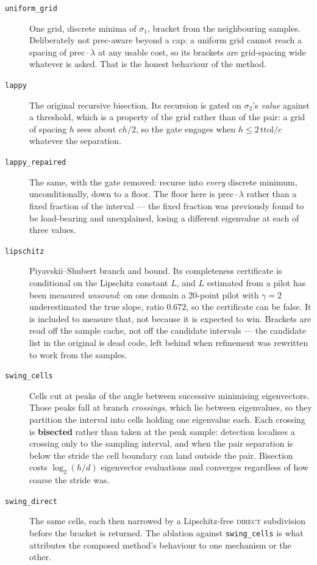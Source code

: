 \documentclass[11pt,a4paper]{article}
\newcommand{\pr}{\ensuremath{\mathrm{prec}}}
\newcommand{\lam}{\ensuremath{\lambda}}
\newcommand{\sig}{\ensuremath{\sigma}}
\begin{document}
\begin{description}
\item[\texttt{uniform\_grid}] One grid, discrete minima of $\sig_1$, bracket from the
neighbouring samples. Deliberately not $\pr$-aware beyond a cap: a uniform grid cannot reach a
spacing of $\pr\!\cdot\!\lam$ at any usable cost, so its brackets are grid-spacing wide
whatever is asked. That is the honest behaviour of the method.

\item[\texttt{lappy}] The original recursive bisection. Its recursion is gated on $\sig_2$'s
\emph{value} against a threshold, which is a property of the grid rather than of the pair: a
grid of spacing $h$ sees about $c h/2$, so the gate engages when $h \le 2\,\mathrm{ttol}/c$
whatever the separation.

\item[\texttt{lappy\_repaired}] The same, with the gate removed: recurse into \emph{every}
discrete minimum, unconditionally, down to a floor. The floor here is $\pr\!\cdot\!\lam$
rather than a fixed fraction of the interval --- the fixed fraction was previously found to be
load-bearing and unexplained, losing a different eigenvalue at each of three values.

\item[\texttt{lipschitz}] Piyavskii--Shubert branch and bound. Its completeness certificate is
conditional on the Lipschitz constant $L$, and $L$ estimated from a pilot has been measured
\emph{unsound}: on one domain a 20-point pilot with $\gamma = 2$ underestimated the true slope,
ratio $0.672$, so the certificate can be false. It is included to measure that, not because it
is expected to win. Brackets are read off the sample cache, not off the candidate intervals ---
the candidate list in the original is dead code, left behind when refinement was rewritten to
work from the samples.

\item[\texttt{swing\_cells}] Cells cut at peaks of the angle between successive minimising
eigenvectors. Those peaks fall at branch \emph{crossings}, which lie between eigenvalues, so
they partition the interval into cells holding one eigenvalue each. Each crossing is
\textbf{bisected} rather than taken at the peak sample: detection localises a crossing only to
the sampling interval, and when the pair separation is below the stride the cell boundary can
land outside the pair. Bisection costs $\log_2(h/d)$ eigenvector evaluations and converges
regardless of how coarse the stride was.

\item[\texttt{swing\_direct}] The same cells, each then narrowed by a Lipschitz-free
\textsc{direct} subdivision before the bracket is returned. The ablation against
\texttt{swing\_cells} is what attributes the composed method's behaviour to one mechanism or
the other.
\end{description}
\end{document}
